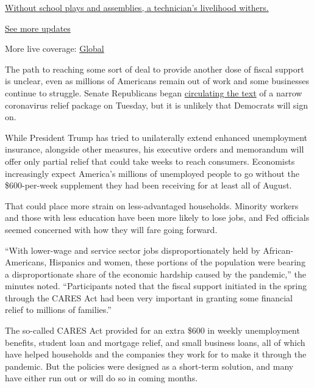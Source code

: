 \href{https://www.nytimes3xbfgragh.onion/live/2020/08/20/business/stock-market-today-coronavirus?action=click\&pgtype=Article\&state=default\&region=MAIN_CONTENT_1\&context=storylines_live_updates\#without-school-plays-and-assemblies-a-technicians-livelihood-withers}{Without
school plays and assemblies, a technician's livelihood withers.}

\href{https://www.nytimes3xbfgragh.onion/live/2020/08/20/business/stock-market-today-coronavirus?action=click\&pgtype=Article\&state=default\&region=MAIN_CONTENT_1\&context=storylines_live_updates}{See
more updates}

More live coverage:
\href{https://www.nytimes3xbfgragh.onion/2020/08/20/world/coronavirus-covid.html?action=click\&pgtype=Article\&state=default\&region=MAIN_CONTENT_1\&context=storylines_live_updates}{Global}

The path to reaching some sort of deal to provide another dose of fiscal
support is unclear, even as millions of Americans remain out of work and
some businesses continue to struggle. Senate Republicans began
\href{https://www.nytimes3xbfgragh.onion/2020/08/18/us/politics/republicans-coronavirus-stimulus-bill.html}{circulating
the text} of a narrow coronavirus relief package on Tuesday, but it is
unlikely that Democrats will sign on.

While President Trump has tried to unilaterally extend enhanced
unemployment insurance, alongside other measures, his executive orders
and memorandum will offer only partial relief that could take weeks to
reach consumers. Economists increasingly expect America's millions of
unemployed people to go without the \$600-per-week supplement they had
been receiving for at least all of August.

That could place more strain on less-advantaged households. Minority
workers and those with less education have been more likely to lose
jobs, and Fed officials seemed concerned with how they will fare going
forward.

``With lower-wage and service sector jobs disproportionately held by
African-Americans, Hispanics and women, these portions of the population
were bearing a disproportionate share of the economic hardship caused by
the pandemic,'' the minutes noted. ``Participants noted that the fiscal
support initiated in the spring through the CARES Act had been very
important in granting some financial relief to millions of families.''

The so-called CARES Act provided for an extra \$600 in weekly
unemployment benefits, student loan and mortgage relief, and small
business loans, all of which have helped households and the companies
they work for to make it through the pandemic. But the policies were
designed as a short-term solution, and many have either run out or will
do so in coming months.


